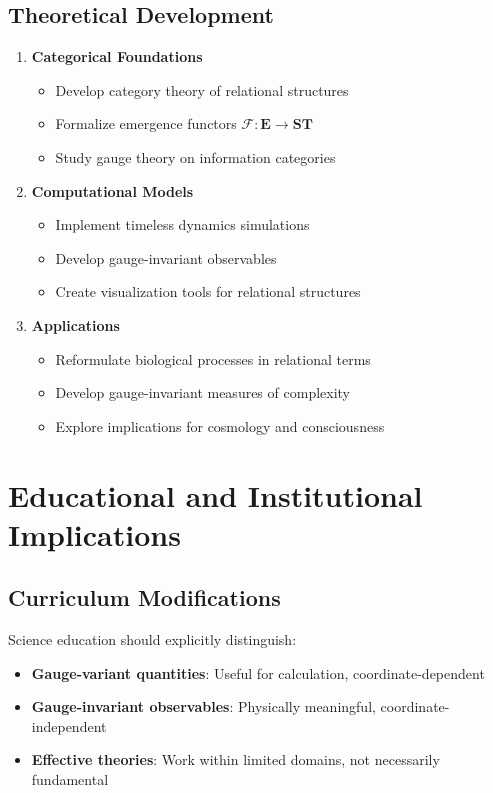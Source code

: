 \documentclass[11pt]{article}
\theoremstyle{definition}
\theoremstyle{plain}
\theoremstyle{remark}
\newcommand{\Ecat}{\mathbf{E}}
\newcommand{\ST}{\mathbf{ST}}
\newcommand{\F}{\mathcal{F}}
\begin{document}
\subsection{Theoretical Development}

\begin{enumerate}
\item \textbf{Categorical Foundations}
   \begin{itemize}
   \item Develop category theory of relational structures
   \item Formalize emergence functors $\F: \Ecat \to \ST$
   \item Study gauge theory on information categories
   \end{itemize}

\item \textbf{Computational Models}
   \begin{itemize}
   \item Implement timeless dynamics simulations
   \item Develop gauge-invariant observables
   \item Create visualization tools for relational structures
   \end{itemize}

\item \textbf{Applications}
   \begin{itemize}
   \item Reformulate biological processes in relational terms
   \item Develop gauge-invariant measures of complexity
   \item Explore implications for cosmology and consciousness
   \end{itemize}
\end{enumerate}

\section{Educational and Institutional Implications}

\subsection{Curriculum Modifications}

\begin{keypoint}
Science education should explicitly distinguish:
\begin{itemize}
\item \textbf{Gauge-variant quantities}: Useful for calculation, coordinate-dependent
\item \textbf{Gauge-invariant observables}: Physically meaningful, coordinate-independent  
\item \textbf{Effective theories}: Work within limited domains, not necessarily fundamental
\end{itemize}
\end{keypoint}
\end{document}
